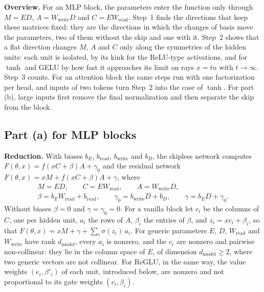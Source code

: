 \documentclass[10pt]{article}
\theoremstyle{definition}
\theoremstyle{remark}
\newcommand{\Wread}{W_{\mathrm{read}}}
\newcommand{\Wwrite}{W_{\mathrm{write}}}
\newcommand{\dm}{d_{\mathrm{model}}}
\newcommand{\para}[1]{\smallskip\noindent\textbf{#1}\hspace{0.5em}}
\begin{document}
\para{Overview.} For an MLP block, the parameters enter the function only through $M = ED$, $A = \Wwrite D$ and $C = E\Wread$. Step~1 finds the directions that keep these matrices fixed: they are the directions in which the changes of basis move the parameters, two of them without the skip and one with it. Step~2 shows that a flat direction changes $M$, $A$ and $C$ only along the symmetries of the hidden units: each unit is isolated, by its kink for the ReLU-type activations, and for $\tanh$ and GELU by how fast it approaches its limit on rays $x = tn$ with $t \to \infty$. Step~3 counts. For an attention block the same steps run with one factorization per head, and inputs of two tokens turn Step~2 into the case of $\tanh$. For part (b), large inputs first remove the final normalization and then separate the skip from the block.

\subsection*{Part (a) for MLP blocks}

\para{Reduction.} With biases $b_E$, $b_{\mathrm{read}}$, $b_{\mathrm{write}}$ and $b_D$, the skipless network computes $F(\theta, x) = f(xC + \beta)A + \gamma_0$ and the residual network $F(\theta, x) = xM + f(xC + \beta)A + \gamma$, where
\begin{gather*}
M = ED,\qquad C = E\Wread,\qquad A = \Wwrite D,\\ \beta = b_E\Wread + b_{\mathrm{read}},\qquad \gamma_0 = b_{\mathrm{write}}D + b_D,\qquad \gamma = b_ED + \gamma_0 .
\end{gather*}
Without biases $\beta = 0$ and $\gamma = \gamma_0 = 0$. For a vanilla block let $c_i$ be the columns of $C$, one per hidden unit, $a_i$ the rows of $A$, $\beta_i$ the entries of $\beta$, and $z_i = xc_i + \beta_i$, so that $F(\theta, x) = xM + \gamma + \sum_i \sigma(z_i)\,a_i$. For generic parameters $E$, $D$, $\Wread$ and $\Wwrite$ have rank $\dm$, every $a_i$ is nonzero, and the $c_i$ are nonzero and pairwise non-collinear: they lie in the column space of $E$, of dimension $\dm \ge 2$, where two generic vectors are not collinear. For ReGLU, in the same way, the value weights $(e_i, \beta'_i)$ of each unit, introduced below, are nonzero and not proportional to its gate weights $(c_i, \beta_i)$.
\end{document}

